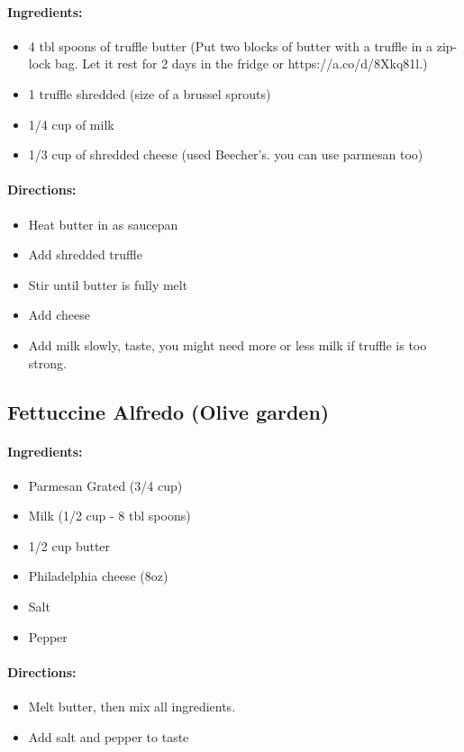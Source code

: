 \documentclass{article}
\begin{document}
\paragraph{Ingredients:}
\begin{itemize}
    \item 4 tbl spoons of truffle butter (Put two blocks of butter with a truffle in a zip-lock bag. Let it rest for 2 days in the fridge or https://a.co/d/8Xkq81l.)
    \item 1 truffle shredded (size of a brussel sprouts)
    \item 1/4 cup of milk
    \item 1/3 cup of shredded cheese (used Beecher's. you can use parmesan too)
\end{itemize}

\paragraph{Directions:}
\begin{itemize}
    \item Heat butter in as saucepan
    \item Add shredded truffle
    \item Stir until butter is fully melt
    \item Add cheese
    \item Add milk slowly, taste, you might need more or less milk if truffle is too strong.
\end{itemize}

\subsection{Fettuccine Alfredo (Olive garden)}

\paragraph{Ingredients:}
\begin{itemize}
    \item Parmesan Grated (3/4 cup)
    \item Milk (1/2 cup - 8 tbl spoons)
    \item 1/2 cup butter
    \item Philadelphia cheese (8oz)
    \item Salt
    \item Pepper
\end{itemize}

\paragraph{Directions:}
\begin{itemize}
    \item Melt butter, then mix all ingredients.
    \item Add salt and pepper to taste
\end{itemize}
\end{document}
